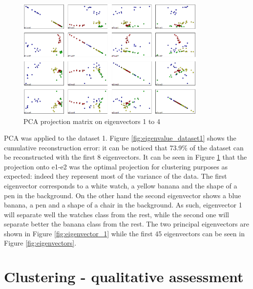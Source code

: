 \documentclass[a4paper,10pt]{article}
\begin{document}
\begin{figure}[H]
  \centering
  \includegraphics[height = 6cm]{pictures/PCA_projections}
  \caption{PCA projection matrix on eigenvectors 1 to 4}
  \label{fig:PCA_matrix}
\end{figure}

PCA was applied to the dataset 1. Figure \ref{fig:eigenvalue_dataset1} shows the cumulative reconstruction error: it can be noticed that 73.9\% of the dataset can be reconstructed with the first 8 eigenvectors. 
It can be seen in Figure \ref{fig:PCA_matrix} that the projection onto e1-e2 was the optimal projection for clustering purposes as expected: indeed they represent most of the variance of the data. The first eigenvector corresponds to a white watch, a yellow banana and the shape of a pen in the background. On the other hand the second eigenvector shows a blue banana, a pen and a shape of a chair in the background. As such, eigenvector 1 will separate well the watches class from the rest, while the second one will separate better the banana class from the rest. The two principal eigenvectors are shown in Figure \ref{fig:eigenvector_1} while the first 45 eigenvectors can be seen in Figure \ref{fig:eigenvectors}.

\section{Clustering - qualitative assessment}
\end{document}
